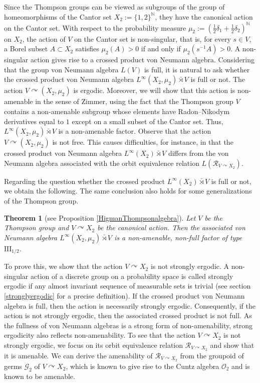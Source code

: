 \documentclass{amsart}
\newcommand{\G}{\mathcal{G}}
\newcommand{\R}{\mathcal{R}}
\newtheorem*{maintheorem}{Theorem}
\theoremstyle{remark}
\theoremstyle{definition}
\begin{document}
Since the Thompson groups can be viewed as subgroups of the group of homeomorphisms of the Cantor set $X_2:= \{ 1, 2 \}^{\mathbb{N}}$, they have the canonical action on the Cantor set.
With respect to the probability measure $\mu _2:= (\frac{1}{2}\delta _1 + \frac{1}{2} \delta _2)^{\mathbb{N}}$ on $X_2$, the action of $V$ on the Cantor set is non-singular, that is, for every $s \in V$, a Borel subset $A \subset X_2$ satisfies $\mu _2 (A) > 0$ if and only if $\mu _2 (s^{-1}A) > 0$.
A non-singular action gives rise to a crossed product von Neumann algebra.
Considering that the group von Neumann algebra $L(V)$ is full, it is natural to ask whether the crossed product von Neumann algebra $L^{\infty}(X_2, \mu _2) \bar{\rtimes} V$ is full or not.
The action $V \curvearrowright (X_2 , \mu _2)$ is ergodic.
Moreover, we will show that this action is non-amenable in the sense of Zimmer, using the fact that the Thompson group $V$ contains a non-amenable subgroup whose elements have Radon--Nikodym derivatives equal to $1$ except on a small subset of the Cantor set.
Thus, $L^{\infty}(X_2, \mu _2) \bar{\rtimes} V$ is a non-amenable factor.
Observe that the action $V \curvearrowright (X_2, \mu _2)$ is not free.
This causes difficulties, for instance, in that the crossed product von Neumann algebra $L^{\infty}(X_2) \bar{\rtimes} V$ differs from the von Neumann algebra associated with the orbit equivalence relation $L(\R _{V \curvearrowright X_2})$.

Regarding the question whether the crossed product $L^{\infty}(X_2) \bar{\rtimes} V$ is full or not, we obtain the following.
The same conclusion also holds for some generalizations of the Thompson group.

\begin{maintheorem}[see Proposition \ref{HigmanThompsonalgebra}]
Let $V$ be the Thompson group and $V \curvearrowright X_2$ be the canonical action.
Then the associated von Neumann algebra $L^{\infty}(X_2, \mu _2) \bar{\rtimes} V$ is a non-amenable, non-full factor of type $\mathrm{III}_{1/2}$.
\end{maintheorem}

To prove this, we show that the action $V \curvearrowright X_2$ is not strongly ergodic.
A non-singular action of a discrete group on a probability space is called strongly ergodic if any almost invariant sequence of measurable sets is trivial (see section \ref{stronglyergodic} for a precise definition).
If the crossed product von Neumann algebra is full, then the action is necessarily strongly ergodic. 
Consequently, if the action is not strongly ergodic, then the associated crossed product is not full.
As the fullness of von Neumann algebras is a strong form of non-amenability, strong ergodicity also reflects non-amenability.
To see that the action $V \curvearrowright X_2$ is not strongly ergodic, we focus on its orbit equivalence relation $\R_{V \curvearrowright X_2}$ and show that it is amenable.
We can derive the amenability of $\R_{V \curvearrowright X_2}$ from the groupoid of germs $\G _2$ of $V \curvearrowright X_2$, which is known to give rise to the Cuntz algebra $\mathcal{O}_2$ and is known to be amenable.
\end{document}
